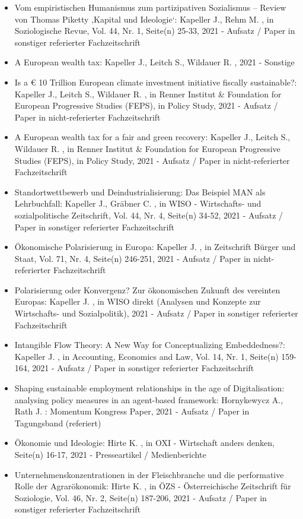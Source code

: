 \begin{itemize}
	 \item Vom empiristischen Humanismus zum partizipativen Sozialismus – Review von Thomas Piketty ‚Kapital und Ideologie‘: Kapeller J., Rehm M. , in Soziologische Revue, Vol. 44, Nr. 1, Seite(n) 25-33, 2021 - Aufsatz / Paper in sonstiger referierter Fachzeitschrift
	 \item A European wealth tax: Kapeller J., Leitch S., Wildauer R. , 2021 - Sonstige
	 \item Is a € 10 Trillion European climate investment initiative fiscally sustainable?: Kapeller J., Leitch S., Wildauer R. , in Renner Institut & Foundation for European Progressive Studies (FEPS), in Policy Study, 2021 - Aufsatz / Paper in nicht-referierter Fachzeitschrift
	 \item A European wealth tax for a fair and green recovery: Kapeller J., Leitch S., Wildauer R. , in Renner Institut & Foundation for European Progressive Studies (FEPS), in Policy Study, 2021 - Aufsatz / Paper in nicht-referierter Fachzeitschrift
	 \item Standortwettbewerb und Deindustrialisierung: Das Beispiel MAN als Lehrbuchfall: Kapeller J., Gräbner C. , in WISO - Wirtschafts- und sozialpolitische Zeitschrift, Vol. 44, Nr. 4, Seite(n) 34-52, 2021 - Aufsatz / Paper in sonstiger referierter Fachzeitschrift
	 \item Ökonomische Polarisierung in Europa: Kapeller J. , in Zeitschrift Bürger und Staat, Vol. 71, Nr. 4, Seite(n) 246-251, 2021 - Aufsatz / Paper in nicht-referierter Fachzeitschrift
	 \item Polarisierung oder Konvergenz? Zur ökonomischen Zukunft des vereinten Europas: Kapeller J. , in WISO direkt (Analysen und Konzepte zur Wirtschafts- und Sozialpolitik), 2021 - Aufsatz / Paper in sonstiger referierter Fachzeitschrift
	 \item Intangible Flow Theory: A New Way for Conceptualizing Embeddedness?: Kapeller J. , in Accounting, Economics and Law, Vol. 14, Nr. 1, Seite(n) 159-164, 2021 - Aufsatz / Paper in sonstiger referierter Fachzeitschrift
	 \item Shaping sustainable employment relationships in the age of Digitalisation: analysing policy measures in an agent-based framework: Hornykewycz A., Rath J. : Momentum Kongress Paper, 2021 - Aufsatz / Paper in Tagungsband (referiert)
	 \item Ökonomie und Ideologie: Hirte K. , in OXI - Wirtschaft anders denken, Seite(n) 16-17, 2021 - Presseartikel / Medienberichte
	 \item Unternehmenskonzentrationen in der Fleischbranche und die performative Rolle der Agrarökonomik: Hirte K. , in ÖZS - Österreichische Zeitschrift für Soziologie, Vol. 46, Nr. 2, Seite(n) 187-206, 2021 - Aufsatz / Paper in sonstiger referierter Fachzeitschrift

\end{itemize}
